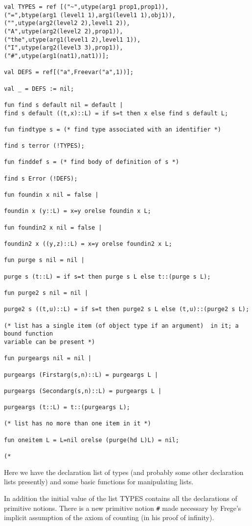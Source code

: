 \documentclass{article}
\begin{document}
{{\begin{verbatim}
val TYPES = ref [("~",utype(arg1 prop1,prop1)),
("=",btype(arg1 (level1 1),arg1(level1 1),obj1)),
("",utype(arg2(level2 2),level1 2)),
("A",utype(arg2(level2 2),prop1)),
("the",utype(arg1(level1 2),level1 1)),
("I",utype(arg2(level3 3),prop1)),
("#",utype(arg1(nat1),nat1))];

val DEFS = ref[("a",Freevar("a",1))];

val _ = DEFS := nil;

fun find s default nil = default |
find s default ((t,x)::L) = if s=t then x else find s default L;

fun findtype s = (* find type associated with an identifier *)

find s terror (!TYPES);

fun finddef s = (* find body of definition of s *)

find s Error (!DEFS);

fun foundin x nil = false |

foundin x (y::L) = x=y orelse foundin x L;

fun foundin2 x nil = false |

foundin2 x ((y,z)::L) = x=y orelse foundin2 x L;

fun purge s nil = nil |

purge s (t::L) = if s=t then purge s L else t::(purge s L);

fun purge2 s nil = nil |

purge2 s ((t,u)::L) = if s=t then purge2 s L else (t,u)::(purge2 s L);

(* list has a single item (of object type if an argument)  in it; a bound function
variable can be present *)

fun purgeargs nil = nil |

purgeargs (Firstarg(s,n)::L) = purgeargs L |

purgeargs (Secondarg(s,n)::L) = purgeargs L |

purgeargs (t::L) = t::(purgeargs L);

(* list has no more than one item in it *)

fun oneitem L = L=nil orelse (purge(hd L)L) = nil;

(*

\end{verbatim}



Here we have the declaration list of types (and probably some other declaration lists presently) and some basic functions for manipulating lists.

In addition the initial value of the list TYPES contains all the declarations of primitive notions.  There is a new primitive notion {\tt \#} made necessary by Frege's implicit assumption of the axiom of counting (in his proof of infinity).

}}
\end{document}
